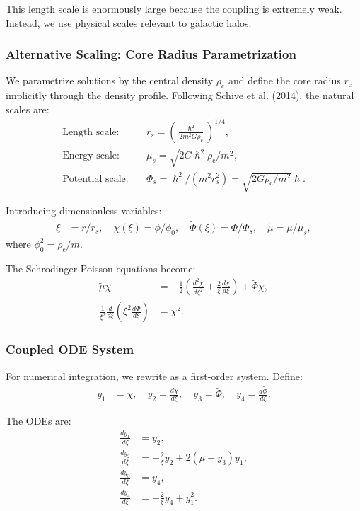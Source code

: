 \documentclass[11pt,a4paper]{article}
\newcommand{\hbar}{\ensuremath{\hslash}}
\newcommand{\rc}{\ensuremath{r_{\mathrm{c}}}}
\newcommand{\rhoc}{\ensuremath{\rho_{\mathrm{c}}}}
\theoremstyle{definition}
\theoremstyle{remark}
\begin{document}
This length scale is enormously large because the coupling is extremely weak. Instead, we use physical scales relevant to galactic halos.

\subsubsection{Alternative Scaling: Core Radius Parametrization}

We parametrize solutions by the central density $\rhoc$ and define the core radius $\rc$ implicitly through the density profile. Following Schive et al. (2014), the natural scales are:
\begin{align}
\text{Length scale:} \quad & r_s = \left(\frac{\hbar^2}{2m^2 G \rhoc}\right)^{1/4}, \label{eq:length_scale}\\
\text{Energy scale:} \quad & \mu_s = \sqrt{2G\hbar^2\rhoc/m^2}, \label{eq:energy_scale}\\
\text{Potential scale:} \quad & \Phi_s = \hbar^2/(m^2 r_s^2) = \sqrt{2G\rhoc/m^2}\hbar. \label{eq:potential_scale}
\end{align}

Introducing dimensionless variables:
\begin{align}
\xi &= r/r_s, \quad \chi(\xi) = \phi/\phi_0, \quad \tilde{\Phi}(\xi) = \Phi/\Phi_s, \quad \tilde{\mu} = \mu/\mu_s,
\end{align}
where $\phi_0^2 = \rhoc/m$.

The Schrodinger-Poisson equations become:
\begin{align}
\tilde{\mu}\chi &= -\frac{1}{2}\left(\frac{d^2\chi}{d\xi^2} + \frac{2}{\xi}\frac{d\chi}{d\xi}\right) + \tilde{\Phi}\chi, \label{eq:SP_dimensionless_1}\\
\frac{1}{\xi^2}\frac{d}{d\xi}\left(\xi^2\frac{d\tilde{\Phi}}{d\xi}\right) &= \chi^2. \label{eq:SP_dimensionless_2}
\end{align}

\subsubsection{Coupled ODE System}

For numerical integration, we rewrite as a first-order system. Define:
\begin{align}
y_1 &= \chi, \quad y_2 = \frac{d\chi}{d\xi}, \quad y_3 = \tilde{\Phi}, \quad y_4 = \frac{d\tilde{\Phi}}{d\xi}.
\end{align}

The ODEs are:
\begin{align}
\frac{dy_1}{d\xi} &= y_2, \\
\frac{dy_2}{d\xi} &= -\frac{2}{\xi}y_2 + 2(\tilde{\mu} - y_3)y_1, \\
\frac{dy_3}{d\xi} &= y_4, \\
\frac{dy_4}{d\xi} &= -\frac{2}{\xi}y_4 + y_1^2.
\end{align}
\end{document}

